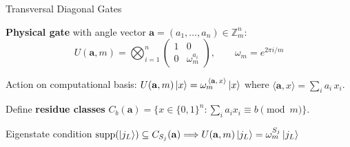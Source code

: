\documentclass[aspectratio=169,t]{beamer}
\newcommand{\ZZ}{\mathbb{Z}}
\newcommand{\Fintwo}{\{0,1\}}
\begin{document}
\begin{frame}{Transversal Diagonal Gates}

\textbf{Physical gate} with angle vector
$\mathbf{a}=(a_1,\ldots,a_n)\in\ZZ_m^n$:
\[
  U(\mathbf{a},m)
  = 
  \bigotimes_{i=1}^{n}\!
  \begin{pmatrix}1&0\\0&\omega_m^{a_i}\end{pmatrix},
  \qquad
  \omega_m = e^{2\pi i/m}
\]

Action on computational basis:
$ U(\mathbf{a},m)\ket{x}
  =  \omega_m^{\,\langle\mathbf{a},\,x\rangle}\ket{x}$
where
$\langle\mathbf{a},x\rangle
  = \sum_{i} a_i\, x_i$.

Define \textbf{residue classes}
$ C_b(\mathbf{a})
  = 
  \bigl\{x\in\Fintwo^n :
    \sum_i a_i x_i \equiv b \pmod{m}\bigr\}$.

\begin{alertblock}{Eigenstate condition}
$\mathrm{supp}(\ket{j_L})\subseteq C_{S_j}(\mathbf{a})
  \Longrightarrow  
U(\mathbf{a},m)\ket{j_L} = \omega_m^{S_j}\ket{j_L}$
\end{alertblock}
\end{frame}
\end{document}
